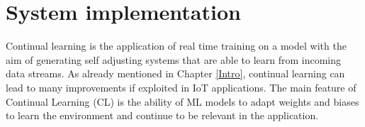 \documentclass[12pt]{report}
\begin{document}
\chapter{System implementation}
Continual learning is the application of real time training on a model with the aim of generating self adjusting systems that are able to learn from incoming data streams. As already mentioned in Chapter \ref{Intro}, continual learning can lead to many improvements if exploited in IoT applications. The main feature of Continual Learning (CL) is the ability of ML models to adapt weights and biases to learn the environment and continue to be relevant in the application. \\
\end{document}
